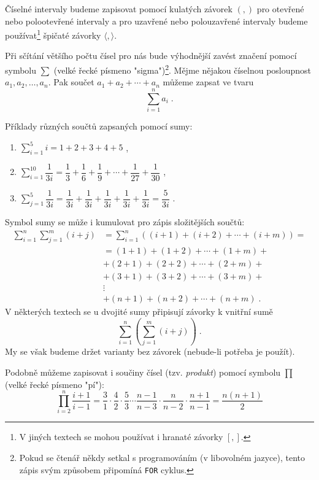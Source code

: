 Číselné intervaly budeme zapisovat pomocí kulatých závorek $(,)$ pro otevřené nebo polootevřené intervaly a pro uzavřené nebo polouzavřené intervaly budeme používat\footnote{V jiných textech se mohou používat i hranaté závorky $[,]$.} špičaté závorky $\langle,\rangle$.\par
\medskip
Při sčítání většího počtu čísel pro nás bude výhodnější zavést značení pomocí symbolu $\sum$ (velké řecké písmeno "sigma")\footnote{Pokud se čtenář někdy setkal s programováním (v libovolném jazyce), tento zápis svým způsobem připomíná \texttt{FOR} cyklus.}. Mějme nějakou číselnou posloupnost $a_1,a_2,\ldots,a_n$. Pak součet $a_1+a_2+\cdots+a_n$ můžeme zapsat ve tvaru
\begin{equation*}
    \sum_{i=1}^{n}{a_i}\; .
\end{equation*}
\begin{example}\label{ex:uziti_sum}
    Příklady různých součtů zapsaných pomocí sumy:
    \begin{enumerate}[label=(\roman*)]
        \item $\displaystyle \sum_{i=1}^{5}{i}=1+2+3+4+5$ ,
        \item $\displaystyle \sum_{i=1}^{10}{\dfrac{1}{3i}}=\dfrac{1}{3}+\dfrac{1}{6}+\dfrac{1}{9}+\cdots+\dfrac{1}{27}+\dfrac{1}{30}$ ,
        \item $\displaystyle \sum_{j=1}^{5}{\dfrac{1}{3i}}=\dfrac{1}{3i}+\dfrac{1}{3i}+\dfrac{1}{3i}+\dfrac{1}{3i}+\dfrac{1}{3i}=\dfrac{5}{3i}$ .
    \end{enumerate}
\end{example}
Symbol sumy se může i kumulovat pro zápis složitějších součtů:
\begin{align*}
    \sum_{i=1}^{n}{\sum_{j=1}^{m}{(i+j)}}&=\sum_{i=1}^{n}{\left((i+1)+(i+2)+\cdots+(i+m)\right)}=\\
    &=(1+1)+(1+2)+\cdots+(1+m)+\\
    &+(2+1)+(2+2)+\cdots+(2+m)+\\
    &+(3+1)+(3+2)+\cdots+(3+m)+\\
    &\vdots\\
    &+(n+1)+(n+2)+\cdots+(n+m)\; .
\end{align*}
V některých textech se u dvojité sumy připisují závorky k vnitřní sumě
\begin{equation*}
    \sum_{i=1}^{n}{\left(\sum_{j=1}^{m}{(i+j)}\right)}\; .
\end{equation*}
My se však budeme držet varianty bez závorek (nebude-li potřeba je použít).\par
Podobně můžeme zapisovat i součiny čísel (tzv. \emph{produkt}) pomocí symbolu $\prod$ (velké řecké písmeno "pí"):
\begin{equation*}
    \prod_{i=2}^{n}{\dfrac{i+1}{i-1}}=\dfrac{3}{1}\cdot\dfrac{4}{2}\cdot\dfrac{5}{3}\cdots\dfrac{n-1}{n-3}\cdot\dfrac{n}{n-2}\cdot\dfrac{n+1}{n-1}=\dfrac{n(n+1)}{2}
\end{equation*}

